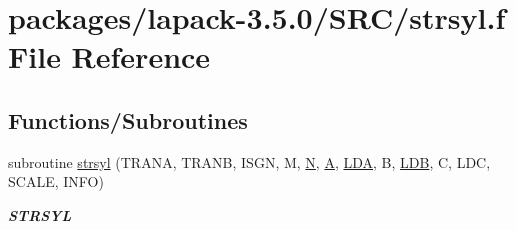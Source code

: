 \hypertarget{strsyl_8f}{}\section{packages/lapack-\/3.5.0/\+S\+R\+C/strsyl.f File Reference}
\label{strsyl_8f}
\subsection*{Functions/\+Subroutines}
\begin{DoxyCompactItemize}
\item 
subroutine \hyperlink{group__realSYcomputational_ga56e2ab6ac5906744561c4c1abb27b83d}{strsyl} (T\+R\+A\+N\+A, T\+R\+A\+N\+B, I\+S\+G\+N, M, \hyperlink{polmisc_8c_a0240ac851181b84ac374872dc5434ee4}{N}, \hyperlink{classA}{A}, \hyperlink{example__user_8c_ae946da542ce0db94dced19b2ecefd1aa}{L\+D\+A}, B, \hyperlink{example__user_8c_a50e90a7104df172b5a89a06c47fcca04}{L\+D\+B}, C, L\+D\+C, S\+C\+A\+L\+E, I\+N\+F\+O)
\begin{DoxyCompactList}\small\item\em {\bfseries S\+T\+R\+S\+Y\+L} \end{DoxyCompactList}\end{DoxyCompactItemize}
